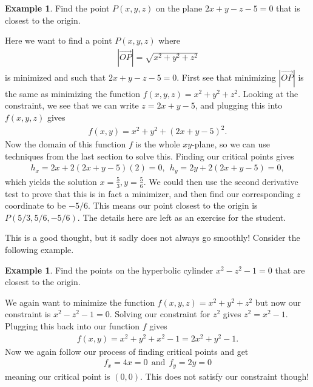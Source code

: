 \documentclass[12pt, letter]{article}
\theoremstyle{plain}
\numberwithin{theorem}{section}
\theoremstyle{definition}
\newtheorem{example}[theorem]{Example}
\begin{document}
\begin{example}
Find the point $P(x,y,z)$ on the plane $2x+y-z-5=0$ that is closest to the origin.

\smallskip

Here we want to find a point $P(x,y,z)$ where
\begin{align*}
|\vec{OP}| = \sqrt{x^2+y^2+z^2}
\end{align*}
is minimized and such that $2x+y-z-5=0$. First see that minimizing $|\vec{OP}|$ is the same as minimizing the function $f(x,y,z) = x^2+y^2+z^2$. Looking at the constraint, we see that we can write $z=2x+y-5$, and plugging this into $f(x,y,z)$ gives
\begin{align*}
f(x,y) = x^2+y^2+(2x+y-5)^2.
\end{align*}
Now the domain of this function $f$ is the whole $xy$-plane, so we can use techniques from the last section to solve this. Finding our critical points gives
\begin{align*}
h_x = 2x+2(2x+y-5)(2)=0, \ \ h_y = 2y+2(2x+y-5) = 0,
\end{align*}
which yields the solution $x=\frac{5}{3}, y=\frac{5}{6}$. We could then use the second derivative test to prove that this is in fact a minimizer, and then find our corresponding $z$ coordinate to be $-5/6$. This means our point closest to the origin is $P(5/3,5/6,-5/6)$. The details here are left as an exercise for the student.
\end{example}

\bigskip

\hrulefill

\bigskip

This is a good thought, but it sadly does not always go smoothly! Consider the following example.

\bigskip

\hrulefill

\bigskip

\begin{example}
Find the points on the hyperbolic cylinder $x^2-z^2-1=0$ that are closest to the origin.

\smallskip

We again want to minimize the function $f(x,y,z) = x^2+y^2+z^2$ but now our constraint is $x^2-z^2-1=0$. Solving our constraint for $z^2$ gives $z^2=x^2-1$. Plugging this back into our function $f$ gives
\begin{align*}
f(x,y) = x^2+y^2+x^2-1 = 2x^2+y^2-1.
\end{align*}
Now we again follow our process of finding critical points and get
\begin{align*}
f_x = 4x=0 \ \ \text{and} \ \ f_y = 2y=0
\end{align*}
meaning our critical point is $(0,0)$. This does not satisfy our constraint though!
\end{example}
\end{document}
